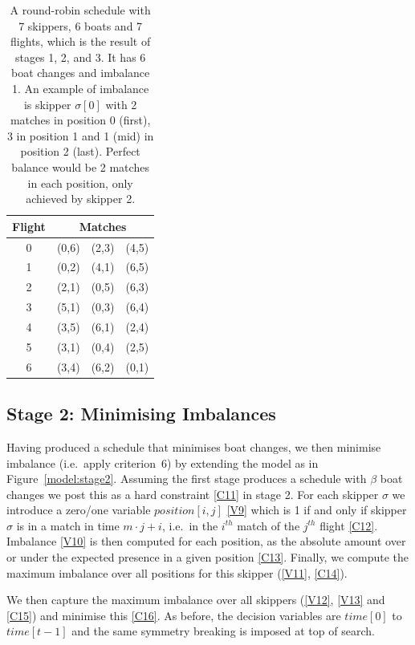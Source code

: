 \documentclass{llncs}
\newcommand{\timeVar}{\mathit{time}}
\begin{document}
{\begin{table}
    \setlength{\tabcolsep}{3pt}
    \begin{tabular}{cccc}
        \toprule
        Flight & \multicolumn{3}{c}{Matches} \\ \midrule
        0 & (0,6) & (2,3) & (4,5) \\
        1 & (0,2) & (4,1) & (6,5) \\
        2 & (2,1) & (0,5) & (6,3) \\
        3 & (5,1) & (0,3) & (6,4) \\
        4 & (3,5) & (6,1) & (2,4) \\
        5 & (3,1) & (0,4) & (2,5) \\
        6 & (3,4) & (6,2) & (0,1) \\ \bottomrule
    \end{tabular}
    \caption{A round-robin schedule with 7 skippers, 6 boats and 7 flights, which is the result of
        stages 1, 2, and 3. It has 6 boat changes and imbalance 1. An example of imbalance is
        skipper $\sigma[{0}]$ with 2 matches in position 0 (first), 3 in position 1 and 1 (mid) in
        position 2 (last). Perfect balance would be 2 matches in each position, only achieved by
    skipper 2.}\label{tab2}
\end{table}
\clearpage %
}

\subsection{Stage 2: Minimising Imbalances}

Having produced a schedule that minimises boat changes, we then minimise imbalance (i.e.\ apply
criterion~6) by extending the model as in Figure~\ref{model:stage2}.  Assuming the first stage
produces a schedule with $\beta$ boat changes we post this as a hard constraint \eqref{C11} in stage
2. For each skipper $\sigma$ we introduce a zero/one variable $position[{i,j}]$ \eqref{V9} which is
1 if and only if skipper $\sigma$ is in a match in time $m \cdot j + i$, i.e.\ in the $i^{th}$ match
of the  $j^{th}$ flight \eqref{C12}. Imbalance \eqref{V10} is then computed for each position, as
the absolute amount over or under the expected presence in a given position \eqref{C13}. Finally, we
compute the maximum imbalance over all positions for this skipper (\ref{V11}, \ref{C14}).

We then capture the maximum imbalance over all skippers (\ref{V12}, \ref{V13} and \ref{C15}) and
minimise this \eqref{C16}. As before, the decision variables are $\timeVar[{0}]$ to
$\timeVar[{t-1}]$ and the same symmetry breaking is imposed at top of search.
\end{document}
